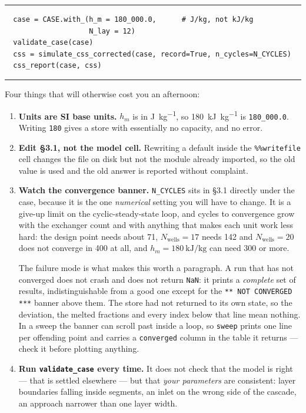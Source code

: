 \documentclass[11pt,a4paper]{article}
\newcommand{\hm}{\ensuremath{h_{m}}}
\newcommand{\Nwells}{\ensuremath{N_{\mathrm{wells}}}}
\newcommand{\code}[1]{\texttt{\small #1}}
\begin{document}
\begingroup
\small
\noindent\rule{\linewidth}{0.4pt}
\begin{verbatim}
  case = CASE.with_(h_m = 180_000.0,      # J/kg, not kJ/kg
                    N_lay = 12)
  validate_case(case)
  css = simulate_css_corrected(case, record=True, n_cycles=N_CYCLES)
  css_report(case, css)
\end{verbatim}
\vspace{-1.2em}
\noindent\rule{\linewidth}{0.4pt}
\endgroup
\medskip

Four things that will otherwise cost you an afternoon:

\begin{enumerate}\itemsep3pt
\item \textbf{Units are SI base units.} $\hm$ is in \si{\joule\per\kilogram}, so
  \SI{180}{\kilo\joule\per\kilogram} is \code{180\_000.0}. Writing \code{180}
  gives a store with essentially no capacity, and no error.

\item \textbf{Edit \S3.1, not the model cell.} Rewriting a default inside the
  \code{\%\%writefile} cell changes the file on disk but not the module already
  imported, so the old value is used and the old answer is reported without
  complaint.

\item \textbf{Watch the convergence banner.} \code{N\_CYCLES} sits in \S3.1
  directly under the case, because it is the one \emph{numerical} setting you
  will have to change. It is a give-up limit on the cyclic-steady-state loop,
  and cycles to convergence grow with the exchanger count and with anything that
  makes each unit work less hard: the design point needs about \num{71},
  $\Nwells=17$ needs \num{142} and $\Nwells=20$ does not converge in
  \num{400} at all, and
  $\hm=\SI{180}{\kilo\joule\per\kilogram}$ can need \num{300} or more.

  The failure mode is what makes this worth a paragraph. A run that has not
  converged does not crash and does not return \code{NaN}: it prints a
  \emph{complete} set of results, indistinguishable from a good one except for
  the \code{*** NOT CONVERGED ***} banner above them. The store had not returned
  to its own state, so the deviation, the melted fractions and every index below
  that line mean nothing. In a sweep the banner can scroll past inside a loop,
  so \code{sweep} prints one line per offending point and carries a
  \code{converged} column in the table it returns --- check it before plotting
  anything.

\item \textbf{Run \code{validate\_case} every time.} It does not check that the
  model is right --- that is settled elsewhere --- but that \emph{your
  parameters} are consistent: layer boundaries falling inside segments, an inlet
  on the wrong side of the cascade, an approach narrower than one layer width.
\end{enumerate}
\end{document}
